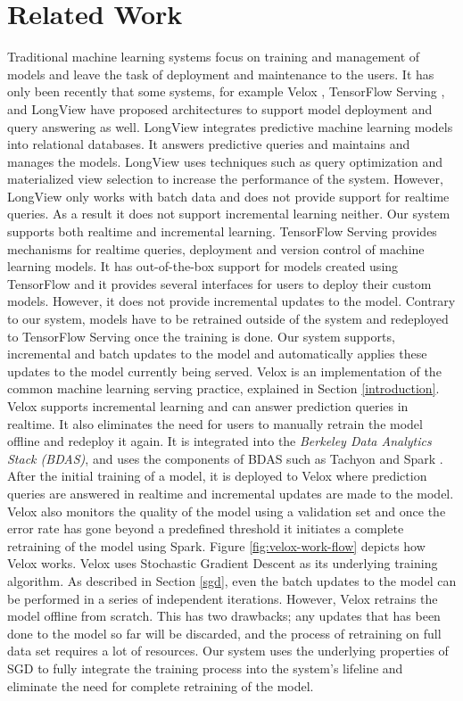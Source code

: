 \documentclass{sig-alternate-05-2015}
\begin{document}
\section{Related Work} \label{related-work}
Traditional machine learning systems focus on training and management of models and leave the task of deployment and maintenance to the users. 
It has only been recently that some systems, for example Velox \cite{crankshaw2014missing}, TensorFlow Serving \cite{abadi2016tensorflow}, and LongView \cite{akdere2011case} have proposed architectures to support model deployment and query answering as well. 
LongView integrates predictive machine learning models into relational databases. 
It answers predictive queries and maintains and manages the models.
LongView uses techniques such as query optimization and materialized view selection to increase the performance of the system.
However, LongView only works with batch data and does not provide support for realtime queries. 
As a result it does not support incremental learning neither.
Our system supports both realtime and incremental learning.
TensorFlow Serving provides mechanisms for realtime queries, deployment and version control of machine learning models.
It has out-of-the-box support for models created using TensorFlow and it provides several interfaces for users to deploy their custom models.
However, it does not provide incremental updates to the model.
Contrary to our system, models have to be retrained outside of the system and redeployed to TensorFlow Serving once the training is done.
Our system supports, incremental and batch updates to the model and automatically applies these updates to the model currently being served.
Velox \cite{crankshaw2014missing} is an implementation of the common machine learning serving practice, explained in Section \ref{introduction}.
Velox supports incremental learning and can answer prediction queries in realtime.
It also eliminates the need for users to manually retrain the model offline and redeploy it again.
It is integrated into the \textit{Berkeley Data Analytics Stack (BDAS)}, and uses the components of BDAS such as Tachyon \cite{li2014tachyon} and Spark \cite{zaharia2010spark}. 
After the initial training of a model, it is deployed to Velox where prediction queries are answered in realtime and incremental updates are made to the model.
Velox also monitors the quality of the model using a validation set and once the error rate has gone beyond a predefined threshold it initiates a complete retraining of the model using Spark. 
Figure \ref{fig:velox-work-flow} depicts how Velox works. 
Velox uses Stochastic Gradient Descent as its underlying training algorithm.
As described in Section \ref{sgd}, even the batch updates to the model can be performed in a series of independent iterations.
However, Velox retrains the model offline from scratch.
This has two drawbacks; any updates that has been done to the model so far will be discarded, and the process of retraining on full data set requires a lot of resources.
Our system uses the underlying properties of SGD to fully integrate the training process into the system's lifeline and eliminate the need for complete retraining of the model.
\end{document}
